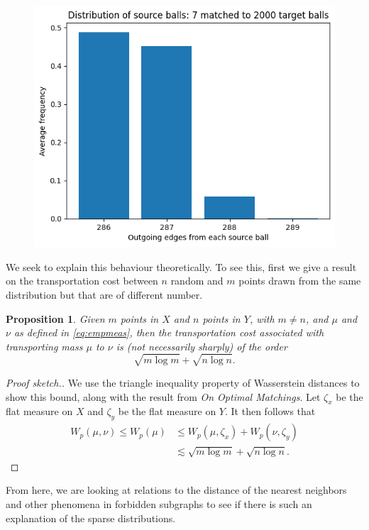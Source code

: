 \documentclass[12pt]{article}%
\theoremstyle{plain}
\newtheorem{proposition}{Proposition}
\begin{document}
\begin{figure}
  \centering
  \hspace*{0cm}\includegraphics[width=1\textwidth,height=\textwidth,keepaspectratio]{images/7-2000.png}
  \caption{}
  \label{fig: B}
\end{figure}

We seek to explain this behaviour theoretically. To see this, first we give a result on the transportation cost between $n$ random and $m$ points drawn from the same distribution but that are of different number.
\begin{proposition}
  Given $m$ points in $X$ and $n$ points in $Y$, with $m \neq n$, and $\mu$ and $\nu$ as defined in \ref{eq:empmeas}, then the transportation cost associated with transporting mass $\mu$ to $\nu$ is (not necessarily sharply) of the order
  \[
    \sqrt{m\log m} + \sqrt{n\log n}.
  \]
\end{proposition}
\begin{proof}[Proof sketch.]
  We use the triangle inequality property of Wasserstein distances to show this bound, along with the result from \textit{On Optimal Matchings}. Let $\zeta_x$ be the flat measure on $X$ and $\zeta_y$ be the flat measure on $Y$. It then follows that
  \begin{align*}
    W_p (\mu, \nu) \leq W_p (\mu) &\leq W_p (\mu, \zeta_x) + W_p (\nu, \zeta_y)\\
    &\lesssim \sqrt{m\log m} + \sqrt{n\log n}.
  \end{align*}
\end{proof}
From here, we are looking at relations to the distance of the nearest neighbors and other phenomena in forbidden subgraphs to see if there is such an explanation of the sparse distributions.
\end{document}
